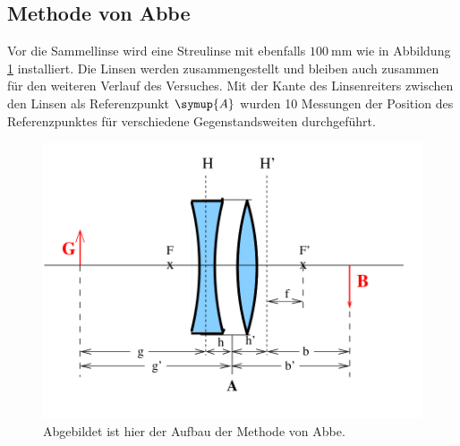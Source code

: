 \subsection{Methode von Abbe}
Vor die Sammellinse wird eine Streulinse mit ebenfalls $\qty{100}{\milli\meter}$ wie in Abbildung \ref{fig:Abbe} installiert.
Die Linsen werden zusammengestellt und bleiben auch zusammen für den weiteren Verlauf des Versuches.
Mit der Kante des Linsenreiters zwischen den Linsen als Referenzpunkt $\symup{A}$ wurden 10 Messungen der Position des Referenzpunktes für verschiedene Gegenstandsweiten durchgeführt.

\begin{figure}
    \includegraphics{../Bilder/Abbe.png}
    \caption{Abgebildet ist hier der Aufbau der Methode von Abbe.}
    \label{fig:Abbe}
\end{figure}
